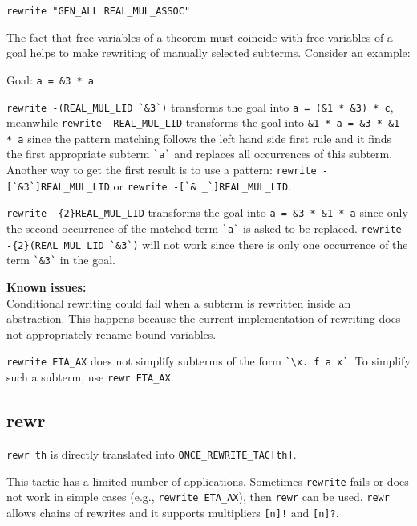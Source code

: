 \documentclass[a4paper]{article}
\newcommand{\issues}{{\bf Known issues:}\\}
\begin{document}
\verb|rewrite "GEN_ALL REAL_MUL_ASSOC"|

The fact that free variables of a theorem must coincide with free variables of a goal helps to make rewriting of manually selected subterms. Consider an example:

Goal: \verb|a = &3 * a|

\verb|rewrite -(REAL_MUL_LID `&3`)| transforms the goal into \verb|a = (&1 * &3) * c|, meanwhile
\verb|rewrite -REAL_MUL_LID| transforms the goal into \verb|&1 * a = &3 * &1 * a| since the pattern matching follows the left hand side first rule and it finds the first appropriate subterm \verb|`a`| and replaces all occurrences of this subterm. Another way to get the first result is to use a pattern: \verb|rewrite -[`&3`]REAL_MUL_LID| or \verb|rewrite -[`& _`]REAL_MUL_LID|.

\verb|rewrite -{2}REAL_MUL_LID| transforms the goal into \verb|a = &3 * &1 * a| since only the second occurrence of the matched term \verb|`a`| is asked to be replaced. \verb|rewrite -{2}(REAL_MUL_LID `&3`)| will not work since there is only one occurrence of the term \verb|`&3`| in the goal.


\issues
Conditional rewriting could fail when a subterm is rewritten inside an abstraction. This happens because the current implementation of rewriting does not appropriately rename bound variables.

\verb|rewrite ETA_AX| does not simplify subterms of the form \verb|`\x. f a x`|. To simplify such a subterm, use \verb|rewr ETA_AX|.


\subsection{rewr}
\verb|rewr th| is directly translated into \verb|ONCE_REWRITE_TAC[th]|.

This tactic has a limited number of applications. Sometimes \verb|rewrite| fails or does not work in simple cases (e.g., \verb|rewrite ETA_AX|), then \verb|rewr| can be used. \verb|rewr| allows chains of rewrites and it supports multipliers \verb|[n]!| and \verb|[n]?|.
\end{document}
